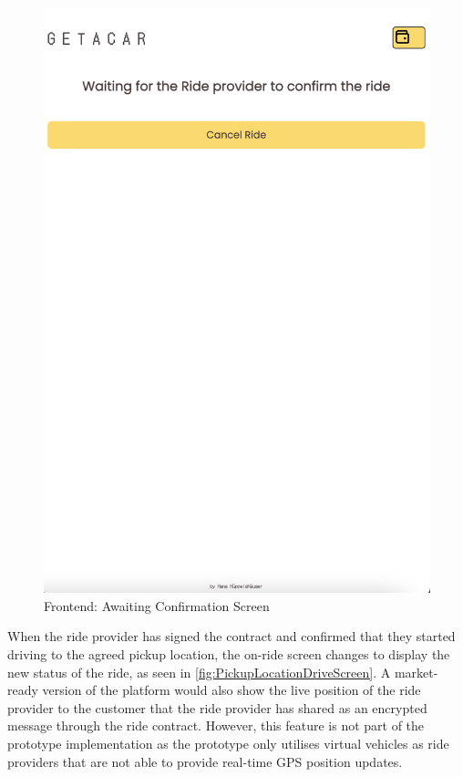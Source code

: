 \begin{figure}[H]
\begin{minipage}{0.45\linewidth}
        \label{fig:RideOverviewScreen}
    \end{minipage}
    \hfill
    \begin{minipage}{0.45\linewidth}
        \centering
        \includegraphics[width=\linewidth]{data/ffss/6.png}
        \caption{Frontend: Awaiting Confirmation Screen}
        \label{fig:AwaitingConfirmationScreen}
    \end{minipage}
    
\end{figure}

When the ride provider has signed the contract and confirmed that they started driving to the agreed pickup location, the on-ride screen changes to display the new status of the ride, as seen in \ref{fig:PickupLocationDriveScreen}. A market-ready version of the platform would also show the live position of the ride provider to the customer that the ride provider has shared as an encrypted message through the ride contract. However, this feature is not part of the prototype implementation as the prototype only utilises virtual vehicles as ride providers that are not able to provide real-time GPS position updates.

